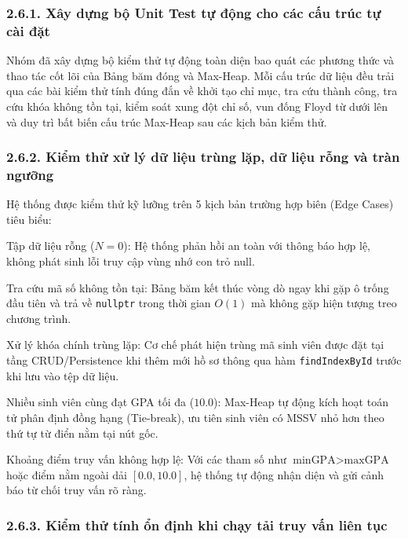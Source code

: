 \documentclass[14pt,a4paper]{extarticle}
\begin{document}
\subsubsection*{2.6.1. Xây dựng bộ Unit Test tự động cho các cấu trúc tự cài đặt}
{}

Nhóm đã xây dựng bộ kiểm thử tự động toàn diện bao quát các phương thức và thao tác cốt lõi của Bảng băm đóng và Max-Heap. Mỗi cấu trúc dữ liệu đều trải qua các bài kiểm thử tính đúng đắn về khởi tạo chỉ mục, tra cứu thành công, tra cứu khóa không tồn tại, kiểm soát xung đột chỉ số, vun đống Floyd từ dưới lên và duy trì bất biến cấu trúc Max-Heap sau các kịch bản kiểm thử.

\subsubsection*{2.6.2. Kiểm thử xử lý dữ liệu trùng lặp, dữ liệu rỗng và tràn ngưỡng}
{}

Hệ thống được kiểm thử kỹ lưỡng trên 5 kịch bản trường hợp biên (Edge Cases) tiêu biểu:

Tập dữ liệu rỗng ($N = 0$): Hệ thống phản hồi an toàn với thông báo hợp lệ, không phát sinh lỗi truy cập vùng nhớ con trỏ null.

Tra cứu mã số không tồn tại: Bảng băm kết thúc vòng dò ngay khi gặp ô trống đầu tiên và trả về \texttt{nullptr} trong thời gian $O(1)$ mà không gặp hiện tượng treo chương trình.

Xử lý khóa chính trùng lặp: Cơ chế phát hiện trùng mã sinh viên được đặt tại tầng CRUD/Persistence khi thêm mới hồ sơ thông qua hàm \texttt{findIndexById} trước khi lưu vào tệp dữ liệu.

Nhiều sinh viên cùng đạt GPA tối đa ($10.0$): Max-Heap tự động kích hoạt toán tử phân định đồng hạng (Tie-break), ưu tiên sinh viên có MSSV nhỏ hơn theo thứ tự từ điển nằm tại nút gốc.

Khoảng điểm truy vấn không hợp lệ: Với các tham số như $\text{minGPA} > \text{maxGPA}$ hoặc điểm nằm ngoài dải $[0.0, 10.0]$, hệ thống tự động nhận diện và gửi cảnh báo từ chối truy vấn rõ ràng.

\subsubsection*{2.6.3. Kiểm thử tính ổn định khi chạy tải truy vấn liên tục}
{}
\end{document}
